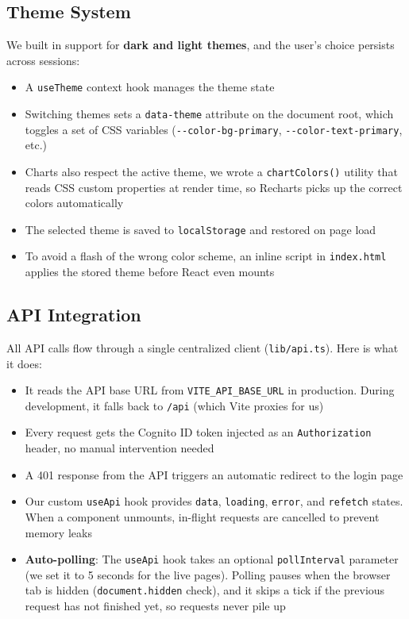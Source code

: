 \documentclass[11pt,a4paper]{article}
\begin{document}
\subsection{Theme System}

We built in support for \textbf{dark and light themes}, and the user's choice persists across sessions:

\begin{itemize}[leftmargin=2em]
    \item A \texttt{useTheme} context hook manages the theme state
    \item Switching themes sets a \texttt{data-theme} attribute on the document root, which toggles a set of CSS variables (\texttt{-{}-color-bg-primary}, \texttt{-{}-color-text-primary}, etc.)
    \item Charts also respect the active theme, we wrote a \texttt{chartColors()} utility that reads CSS custom properties at render time, so Recharts picks up the correct colors automatically
    \item The selected theme is saved to \texttt{localStorage} and restored on page load
    \item To avoid a flash of the wrong color scheme, an inline script in \texttt{index.html} applies the stored theme before React even mounts
\end{itemize}

\subsection{API Integration}

All API calls flow through a single centralized client (\texttt{lib/api.ts}). Here is what it does:

\begin{itemize}[leftmargin=2em]
    \item It reads the API base URL from \texttt{VITE\_API\_BASE\_URL} in production. During development, it falls back to \texttt{/api} (which Vite proxies for us)
    \item Every request gets the Cognito ID token injected as an \texttt{Authorization} header, no manual intervention needed
    \item A 401 response from the API triggers an automatic redirect to the login page
    \item Our custom \texttt{useApi} hook provides \texttt{data}, \texttt{loading}, \texttt{error}, and \texttt{refetch} states. When a component unmounts, in-flight requests are cancelled to prevent memory leaks
    \item \textbf{Auto-polling}: The \texttt{useApi} hook takes an optional \texttt{pollInterval} parameter (we set it to 5 seconds for the live pages). Polling pauses when the browser tab is hidden (\texttt{document.hidden} check), and it skips a tick if the previous request has not finished yet, so requests never pile up
\end{itemize}
\end{document}
